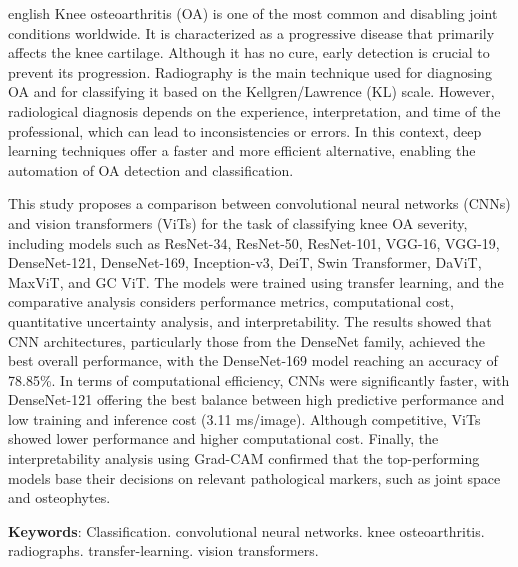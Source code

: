 \begin{resumo}[Abstract]
 \begin{otherlanguage*}{english}
  Knee osteoarthritis (OA) is one of the most common and disabling joint conditions worldwide. It is characterized as a progressive disease that primarily affects the knee cartilage. Although it has no cure, early detection is crucial to prevent its progression. Radiography is the main technique used for diagnosing OA and for classifying it based on the Kellgren/Lawrence (KL) scale. However, radiological diagnosis depends on the experience, interpretation, and time of the professional, which can lead to inconsistencies or errors. In this context, deep learning techniques offer a faster and more efficient alternative, enabling the automation of OA detection and classification.

  This study proposes a comparison between convolutional neural networks (CNNs) and vision transformers (ViTs) for the task of classifying knee OA severity, including models such as ResNet-34, ResNet-50, ResNet-101, VGG-16, VGG-19, DenseNet-121, DenseNet-169, Inception-v3, DeiT, Swin Transformer, DaViT, MaxViT, and GC ViT. The models were trained using transfer learning, and the comparative analysis considers performance metrics, computational cost, quantitative uncertainty analysis, and interpretability. The results showed that CNN architectures, particularly those from the DenseNet family, achieved the best overall performance, with the DenseNet-169 model reaching an accuracy of 78.85\%. In terms of computational efficiency, CNNs were significantly faster, with DenseNet-121 offering the best balance between high predictive performance and low training and inference cost (3.11 ms/image). Although competitive, ViTs showed lower performance and higher computational cost. Finally, the interpretability analysis using Grad-CAM confirmed that the top-performing models base their decisions on relevant pathological markers, such as joint space and osteophytes.

   \vspace{\onelineskip}
 
   \noindent 
   \textbf{Keywords}: Classification. convolutional neural networks. knee osteoarthritis. radiographs. transfer-learning. vision transformers.
 \end{otherlanguage*}
\end{resumo}